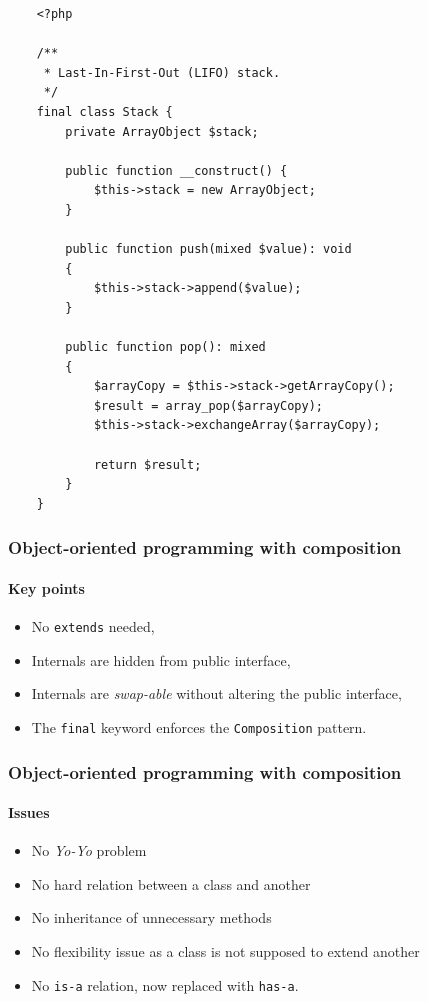 \begin{frame}[fragile,c]
    \begin{lstlisting}
    <?php

    /**
     * Last-In-First-Out (LIFO) stack.
     */
    final class Stack {
        private ArrayObject $stack;

        public function __construct() {
            $this->stack = new ArrayObject;
        }

        public function push(mixed $value): void
        {
            $this->stack->append($value);
        }

        public function pop(): mixed
        {
            $arrayCopy = $this->stack->getArrayCopy();
            $result = array_pop($arrayCopy);
            $this->stack->exchangeArray($arrayCopy);

            return $result;
        }
    }
    \end{lstlisting}
\end{frame}

\begin{frame}
    \frametitle{Object-oriented programming with composition}
    \framesubtitle{Key points}

    \begin{itemize}[<+->]
        \item No \texttt{extends} needed,
        \item Internals are hidden from public interface,
        \item Internals are \textit{swap-able} without altering the public interface,
        \item The \texttt{final} keyword enforces the \texttt{Composition} pattern.
    \end{itemize}
\end{frame}

\begin{frame}
    \frametitle{Object-oriented programming with composition}
    \framesubtitle{Issues}

    \begin{itemize}[<+->]
        \item No \textit{Yo-Yo} problem
        \item No hard relation between a class and another
        \item No inheritance of unnecessary methods
        \item No flexibility issue as a class is not supposed to extend another
        \item No \texttt{is-a} relation, now replaced with \texttt{has-a}.
    \end{itemize}
\end{frame}

